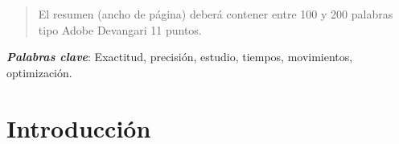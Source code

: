     
    
    
    \maketitle
    \thispagestyle{fancy}
    
    
    
    \begin{abstract}
    \noindent 
    El resumen (ancho de página) deberá contener entre 100 y 200 palabras tipo Adobe Devangari 11 puntos.
    
    \end{abstract}
    \textbf{\textit{Palabras clave}}: {Exactitud, precisión, estudio, tiempos, movimientos, optimización.}
    
    
    \section{Introducción}
    
